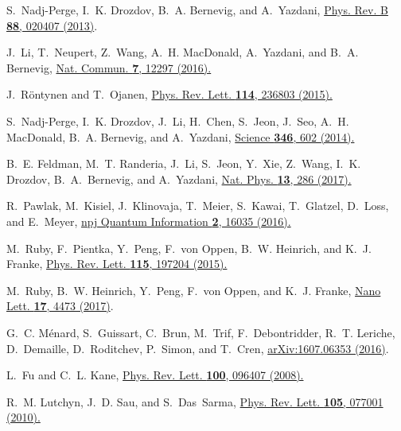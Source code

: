 \documentclass[aps,prl,reprint,nobibnotes]{revtex4-1}
\begin{document}
\begin{thebibliography}{10}

S.~Nadj-Perge, I.~K. Drozdov, B.~A. Bernevig, and A.~Yazdani,
\newblock \href{https://doi.org/10.1103/PhysRevB.88.020407}{Phys. Rev. B {\bf 88}, 020407 (2013)}.

J.~Li, T.~Neupert, Z.~Wang, A.~H. MacDonald, A.~Yazdani, and B.~A. Bernevig,
\newblock \href{https://doi.org/10.1038/ncomms12297}{Nat. Commun. {\bf 7}, 12297 (2016).}

J.~R\"ontynen and T.~Ojanen,
\newblock \href{http://dx.doi.org/10.1103/PhysRevLett.114.236803}{Phys. Rev. Lett. {\bf 114}, 236803 (2015).}

S.~Nadj-Perge, I.~K. Drozdov, J.~Li, H.~Chen, S.~Jeon, J.~Seo, A.~H. MacDonald,
  B.~A. Bernevig, and A.~Yazdani,
\newblock \href{http://dx.doi.org/10.1126/science.1259327}{Science {\bf 346}, 602 (2014).}

B.~E. Feldman, M.~T. Randeria, J.~Li, S.~Jeon, Y.~Xie, Z.~Wang, I.~K. Drozdov,
  B.~A.~Bernevig, and A.~Yazdani,
\newblock \href{http://dx.doi.org/10.1038/nphys3947}{Nat. Phys. {\bf 13}, 286 (2017).}

R.~Pawlak, M.~Kisiel, J.~Klinovaja, T.~Meier, S.~Kawai, T.~Glatzel, D.~Loss,
  and E.~Meyer,
\newblock \href{http://dx.doi.org/10.1038/npjqi.2016.35}{npj Quantum Information {\bf 2}, 16035 (2016).}

M.~Ruby, F.~Pientka, Y.~Peng, F.~von Oppen, B.~W. Heinrich, and K.~J. Franke,
\newblock \href{https://doi.org/10.1103/PhysRevLett.115.197204}{Phys. Rev. Lett. {\bf 115}, 197204 (2015).}

M.~Ruby, B.~W. Heinrich, Y.~Peng, F.~von Oppen, and K.~J. Franke,
\newblock \href{http://dx.doi.org/10.1021/acs.nanolett.7b01728}{Nano Lett. {\bf 17}, 4473 (2017)}.

G.~C. {M{\'e}nard}, S.~{Guissart}, C.~{Brun}, M.~{Trif}, F.~{Debontridder},
  R.~T. {Leriche}, D.~{Demaille}, D.~{Roditchev}, P.~{Simon}, and T.~{Cren},
\newblock \href{https://arxiv.org/abs/1607.06353}{arXiv:1607.06353 (2016)}.

L.~Fu and C.~L. Kane,
\newblock \href{https://doi.org/10.1103/PhysRevLett.100.096407}{Phys. Rev. Lett. {\bf 100}, 096407 (2008).}

R.~M. Lutchyn, J.~D. Sau, and S.~Das~Sarma,
\newblock \href{https://doi.org/10.1103/PhysRevLett.105.077001}{Phys. Rev. Lett. {\bf 105}, 077001 (2010).}


\end{thebibliography}
\end{document}
